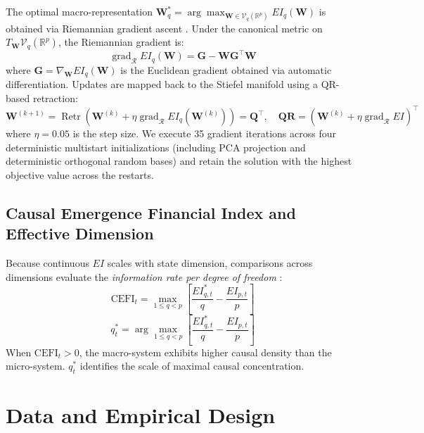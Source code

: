 \documentclass[review,12pt,authoryear]{elsarticle}
\begin{document}
The optimal macro-representation $\mathbf{W}_q^* = \arg\max_{\mathbf{W} \in \mathcal{V}_q(\mathbb{R}^p)} EI_q(\mathbf{W})$ is obtained via Riemannian gradient ascent \citep{edelman1998geometry, absil2008optimization}. Under the canonical metric on $T_{\mathbf{W}}\mathcal{V}_q(\mathbb{R}^p)$, the Riemannian gradient is:
\begin{equation}
\operatorname{grad}_{\mathcal{R}} EI_q(\mathbf{W}) = \mathbf{G} - \mathbf{W}\mathbf{G}^\top \mathbf{W}
\end{equation}
where $\mathbf{G} = \nabla_{\mathbf{W}} EI_q(\mathbf{W})$ is the Euclidean gradient obtained via automatic differentiation. Updates are mapped back to the Stiefel manifold using a QR-based retraction:
\begin{equation}
\mathbf{W}^{(k+1)} = \operatorname{Retr}\left( \mathbf{W}^{(k)} + \eta \operatorname{grad}_{\mathcal{R}} EI_q(\mathbf{W}^{(k)}) \right) = \mathbf{Q}^\top, \quad \mathbf{Q}\mathbf{R} = \left(\mathbf{W}^{(k)} + \eta \operatorname{grad}_{\mathcal{R}} EI\right)^\top
\end{equation}
where $\eta = 0.05$ is the step size. We execute 35 gradient iterations across four deterministic multistart initializations (including PCA projection and deterministic orthogonal random bases) and retain the solution with the highest objective value across the restarts.

\subsection{Causal Emergence Financial Index and Effective Dimension}
Because continuous $EI$ scales with state dimension, comparisons across dimensions evaluate the \emph{information rate per degree of freedom} \citep{liu2024exact}:
\begin{equation}
\mathrm{CEFI}_t = \max_{1 \le q < p} \left[ \frac{EI_{q,t}^*}{q} - \frac{EI_{p,t}}{p} \right]
\label{eq:cefi_def}
\end{equation}
\begin{equation}
q_t^* = \arg\max_{1 \le q < p} \left[ \frac{EI_{q,t}^*}{q} - \frac{EI_{p,t}}{p} \right]
\label{eq:q_star_def}
\end{equation}
When $\mathrm{CEFI}_t > 0$, the macro-system exhibits higher causal density than the micro-system. $q_t^*$ identifies the scale of maximal causal concentration.

\section{Data and Empirical Design}
\label{sec:data}
\end{document}
